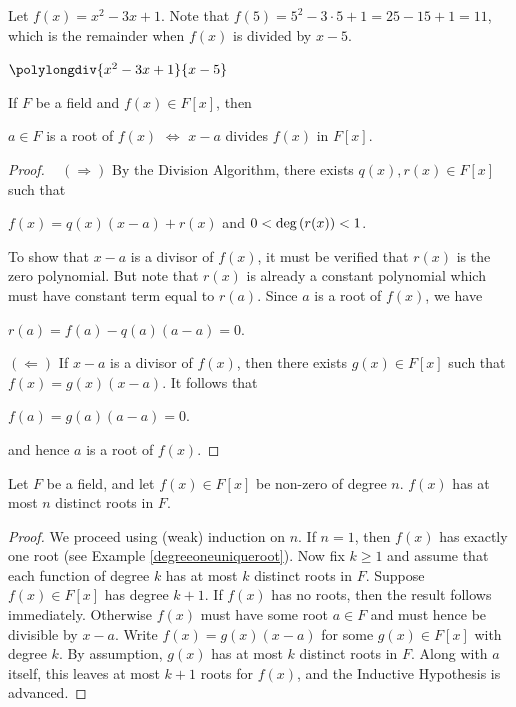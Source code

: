\documentclass[11pt,fleqn,dvipsnames,usenames]{article}
\newcommand{\p}{\noindent}
\begin{document}
%
\begin{example}
Let $f(x) = x^2 - 3x + 1$.  Note that $f(5) = 5^2 - 3\cdot 5 + 1 = 25-15+1= 11$, which is the remainder when $f(x)$ is divided by $x-5$.
\begin{center}
$\polylongdiv{x^2 - 3x + 1}{x-5}$
\end{center}
\end{example}
%
\begin{theorem}\label{factortheorem}
If $F$ be a field and $f(x)\in F[x]$, then
\begin{center}
$a\in F$ is a root of $f(x)$ $\Leftrightarrow$ $x-a$ divides $f(x)$ in $F[x]$.
\end{center}
\end{theorem}
%
\begin{proof}~
\p $(\Rightarrow)$ By the Division Algorithm, there exists $q(x),r(x)\in F[x]$ such that
\begin{center}
$f(x) = q(x)(x-a) + r(x)$ and $0 < \text{deg}\left(r(x)\right) < 1$.
\end{center}
To show that $x-a$ is a divisor of $f(x)$, it must be verified that $r(x)$ is the zero polynomial.  But note that $r(x)$ is already a constant polynomial which must have constant term equal to $r(a)$.  Since $a$ is a root of $f(x)$, we have
\begin{center}
$r(a) = f(a) - q(a)(a - a) = 0$.
\end{center}
\vsp

\p $(\Leftarrow)$ If $x-a$ is a divisor of $f(x)$, then there exists $g(x) \in F[x]$ such that $f(x) = g(x)(x - a)$.  It follows that
\begin{center}
$f(a) = g(a)(a-a) = 0$.
\end{center}
and hence $a$ is a root of $f(x)$.
\end{proof}
%
\begin{corollary}
Let $F$ be a field, and let $f(x)\in F[x]$ be non-zero of degree $n$.  $f(x)$ has at most $n$ distinct roots in $F$.
\end{corollary}
%
\begin{proof}
We proceed using (weak) induction on $n$.  If $n=1$, then $f(x)$ has exactly one root (see Example \ref{degreeoneuniqueroot}).  Now fix $k\geq 1$ and assume that each function of degree $k$ has at most $k$ distinct roots in $F$.   Suppose $f(x)\in F[x]$ has degree $k+1$.  If $f(x)$ has no roots, then the result follows immediately.  Otherwise $f(x)$ must have some root $a\in F$ and must hence be divisible by $x - a$.  Write $f(x) = g(x)(x-a)$ for some $g(x)\in F[x]$ with degree $k$.  By assumption, $g(x)$ has at most $k$ distinct roots in $F$.  Along with $a$ itself, this leaves at most $k+1$ roots for $f(x)$, and the Inductive Hypothesis is advanced.
\end{proof}
\end{document}
